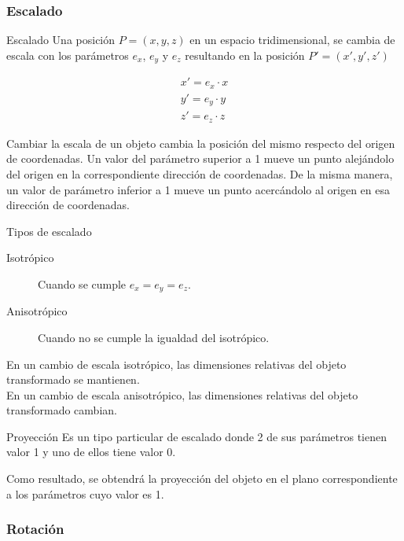 \documentclass[a4paper, twoside]{article}
\begin{document}
\subsubsection{Escalado}
\begin{definicion*}{Escalado}
	Una posición $P = (x, y, z)$ en un espacio tridimensional, se cambia de escala con los parámetros $e_x$, $e_y$ y $e_z$ resultando en la posición $P' = (x', y', z')$

	\begin{align*}
		x' = e_x \cdot x \\
		y' = e_y \cdot y \\
		z' = e_z \cdot z
	\end{align*}

	Cambiar la escala de un objeto cambia la posición del mismo respecto del origen de coordenadas. Un valor del parámetro superior a 1 mueve un punto alejándolo del origen en la correspondiente dirección de coordenadas.
De la misma manera, un valor de parámetro inferior a 1 mueve un punto acercándolo al origen en esa dirección de coordenadas.
\end{definicion*}

\begin{definicion*}{Tipos de escalado}
	\begin{description}
		\item[Isotrópico] Cuando se cumple $ e_x = e_y = e_z $.
		\item[Anisotrópico] Cuando no se cumple la igualdad del isotrópico.
	\end{description}

	En un cambio de escala isotrópico, las dimensiones relativas del objeto transformado se mantienen.\\
	En un cambio de escala anisotrópico, las dimensiones relativas del objeto transformado cambian.
\end{definicion*}

\begin{definicion*}{Proyección}
	Es un tipo particular de escalado donde 2 de sus parámetros tienen valor 1 y uno de ellos tiene valor 0.

	Como resultado, se obtendrá la proyección del objeto en el plano correspondiente a los parámetros cuyo valor es 1.
\end{definicion*}

\subsubsection{Rotación}
\end{document}
